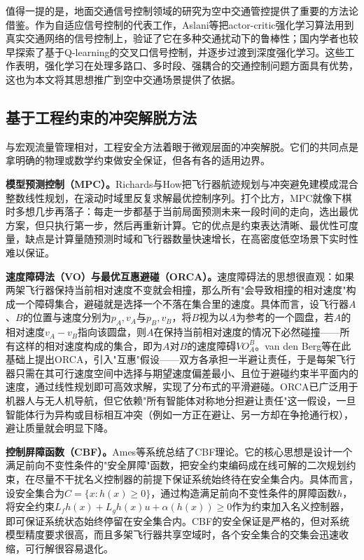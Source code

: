 \documentclass[12pt,a4paper,UTF8]{ctexart}
\begin{document}
值得一提的是，地面交通信号控制领域的研究为空中交通管控提供了重要的方法论借鉴。作为自适应信号控制的代表工作，Aslani等\cite{ref12}把actor-critic强化学习算法用到真实交通网络的信号控制上，验证了它在多种交通扰动下的鲁棒性；国内学者也较早探索了基于Q-learning的交叉口信号控制\cite{ref16,ref19,ref20}，并逐步过渡到深度强化学习\cite{ref15,ref17,ref18,ref22}。这些工作表明，强化学习在处理多路口、多时段、强耦合的交通控制问题方面具有优势，这也为本文将其思想推广到空中交通场景提供了依据。

\subsection{基于工程约束的冲突解脱方法}

与宏观流量管理相对，工程安全方法着眼于微观层面的冲突解脱。它们的共同点是拿明确的物理或数学约束做安全保证，但各有各的适用边界。

\textbf{模型预测控制（MPC）。}Richards与How\cite{ref3}把飞行器航迹规划与冲突避免建模成混合整数线性规划，在滚动时域里反复求解最优控制序列。打个比方，MPC就像下棋时多想几步再落子：每走一步都基于当前局面预测未来一段时间的走向，选出最优方案，但只执行第一步，然后再重新计算。它的优点是约束表达清晰、最优性可度量，缺点是计算量随预测时域和飞行器数量快速增长，在高密度低空场景下实时性难以保证。

\textbf{速度障碍法（VO）与最优互惠避碰（ORCA）。}速度障碍法的思想很直观：如果两架飞行器保持当前相对速度不变就会相撞，那么所有"会导致相撞的相对速度"构成一个障碍集合，避碰就是选择一个不落在集合里的速度。具体而言，设飞行器$A$、$B$的位置与速度分别为$p_A,v_A$与$p_B,v_B$，将$B$视为以$A$为参考的一个圆盘，若$A$的相对速度$v_A-v_B$指向该圆盘，则$A$在保持当前相对速度的情况下必然碰撞——所有这样的相对速度构成的集合，即为$A$对$B$的速度障碍$VO^B_A$。van den Berg等\cite{ref4}在此基础上提出ORCA，引入"互惠"假设——双方各承担一半避让责任，于是每架飞行器只需在其可行速度空间中选择与期望速度偏差最小、且位于避碰约束半平面内的速度，通过线性规划即可高效求解，实现了分布式的平滑避碰。ORCA已广泛用于机器人与无人机导航，但它依赖"所有智能体对称地分担避让责任"这一假设，一旦智能体行为异构或目标相互冲突（例如一方正在避让、另一方却在争抢通行权），避让质量就会明显下降。

\textbf{控制屏障函数（CBF）。}Ames等\cite{ref5}系统总结了CBF理论。它的核心思想是设计一个满足前向不变性条件的"安全屏障"函数，把安全约束编码成在线可解的二次规划约束，在尽量不干扰名义控制器的前提下保证系统始终待在安全集合内。具体而言，设安全集合为$C=\{x:h(x)\geq0\}$，通过构造满足前向不变性条件的屏障函数$h$，将安全约束$L_f h(x)+L_g h(x)u+\alpha(h(x))\geq0$作为约束加入名义控制器，即可保证系统状态始终停留在安全集合内。CBF的安全保证是严格的，但对系统模型精度要求很高，而且多架飞行器共享空域时，各个安全集合的交集会迅速收缩，可行解很容易退化。
\end{document}
